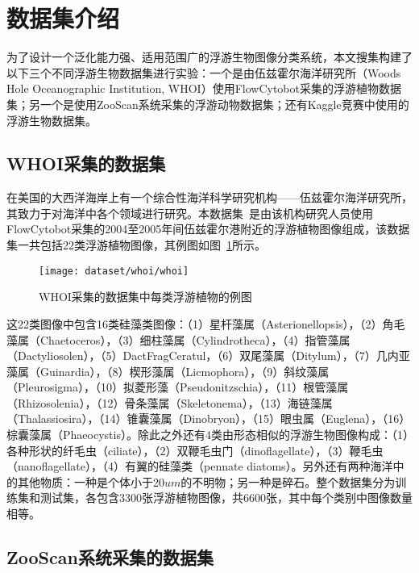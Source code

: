 \section{数据集介绍}
\label{sec:dataset}

为了设计一个泛化能力强、适用范围广的浮游生物图像分类系统，本文搜集构建了以下三个不同浮游生物数据集进行实验：一个是由伍兹霍尔海洋研究所（Woods Hole Oceanographic Institution, WHOI）使用FlowCytobot采集的浮游植物数据集；另一个是使用ZooScan系统采集的浮游动物数据集；还有Kaggle竞赛中使用的浮游生物数据集。

\subsection{WHOI采集的数据集}
\label{sec:whoidataset}

在美国的大西洋海岸上有一个综合性海洋科学研究机构——伍兹霍尔海洋研究所，其致力于对海洋中各个领域进行研究。本数据集~\cite{sosik2007automated}是由该机构研究人员使用FlowCytobot采集的2004至2005年间伍兹霍尔港附近的浮游植物图像组成，该数据集一共包括22类浮游植物图像，其例图如图~\ref{fig:whoi}所示。
\begin{figure}[H] %
  \centering
  \texttt{[image: dataset/whoi/whoi]}
  \caption{WHOI采集的数据集中每类浮游植物的例图}
  \label{fig:whoi}
\end{figure}

这22类图像中包含16类硅藻类图像：（1）星杆藻属（Asterionellopsis），（2）角毛藻属（Chaetoceros），（3）细柱藻属（Cylindrotheca），（4）指管藻属（Dactyliosolen），（5）DactFragCeratul，（6）双尾藻属（Ditylum），（7）几内亚藻属（Guinardia），（8）楔形藻属（Licmophora），（9）斜纹藻属（Pleurosigma），（10）拟菱形藻（Pseudonitzschia），（11）根管藻属（Rhizosolenia），（12）骨条藻属（Skeletonema），（13）海链藻属（Thalassiosira），（14）锥囊藻属（Dinobryon），（15）眼虫属（Euglena），（16）棕囊藻属（Phaeocystis）。除此之外还有4类由形态相似的浮游生物图像构成：（1）各种形状的纤毛虫（ciliate），（2）双鞭毛虫门（dinoflagellate），（3）鞭毛虫（nanoflagellate），（4）有翼的硅藻类（pennate diatoms）。另外还有两种海洋中的其他物质：一种是个体小于20$um$的不明物；另一种是碎石。整个数据集分为训练集和测试集，各包含3300张浮游植物图像，共6600张，其中每个类别中图像数量相等。

\subsection{ZooScan系统采集的数据集}
\label{sec:caldataset}

